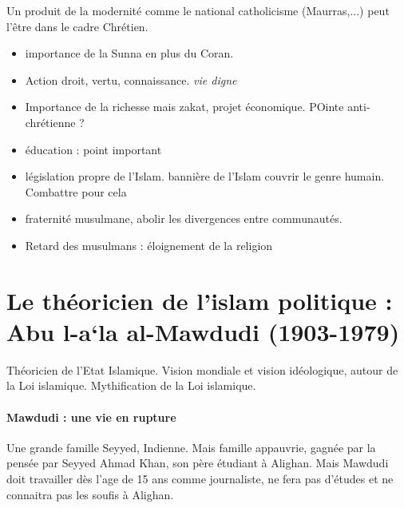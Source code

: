 \begin{Synthesis}
Un produit de la modernité comme le national catholicisme (Maurras,...) peut l'être dans le cadre Chrétien. 

\begin{itemize}
    \item  importance de la Sunna en plus du Coran.  

    \item  Action droit, vertu, connaissance.  \textit{vie digne}

    \item  Importance de la richesse mais zakat, projet économique. POinte anti-chrétienne ?

    \item éducation : point important
    
    \item législation propre de l'Islam. bannière de l'Islam couvrir le genre humain. Combattre pour cela
    
    \item fraternité musulmane, abolir les divergences entre communautés.
    
    \item Retard des musulmans : éloignement de la religion
    
\end{itemize}
\end{Synthesis}

   



    



    



  \section{{Le théoricien de l'islam
  politique} : {Abu l-a`la al-Mawdudi
  (1903-1979)}}

\begin{Synthesis}[Al-Mawdudi]
Théoricien de l'Etat Islamique. Vision mondiale et vision idéologique, autour de la Loi islamique. Mythification de la Loi islamique.
\end{Synthesis}

\paragraph{ Mawdudi : une vie en rupture} Une grande famille Seyyed, Indienne. Mais famille appauvrie, gagnée par la pensée par  Seyyed Ahmad Khan, son père étudiant à Alighan. Mais Mawdudi doit travailler dès l'age de 15 ans comme journaliste, ne fera pas d'études et ne connaitra pas les soufis à Alighan.

